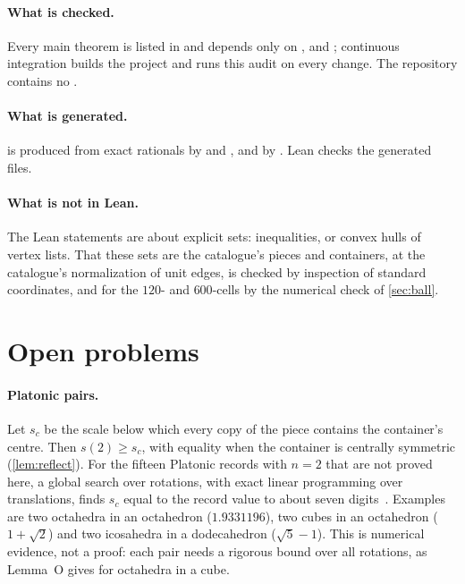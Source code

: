 \documentclass[11pt,a4paper]{article}
\begin{document}
\paragraph{What is checked.} Every main theorem is listed in  and depends only on ,  and ; continuous integration builds the project and runs this audit on every change. The repository contains no .

\paragraph{What is generated.}  is produced from exact rationals by  and , and  by . Lean checks the generated files.

\paragraph{What is not in Lean.} The Lean statements are about explicit sets: inequalities, or convex hulls of vertex lists. That these sets are the catalogue's pieces and containers, at the catalogue's normalization of unit edges, is checked by inspection of standard coordinates, and for the $120$- and $600$-cells by the numerical check of \cref{sec:ball}.

\section{Open problems}\label{sec:open}

\paragraph{Platonic pairs.} Let $s_c$ be the scale below which every copy of the piece contains the container's centre. Then $s(2)\ge s_c$, with equality when the container is centrally symmetric (\cref{lem:reflect}). For the fifteen Platonic records with $n=2$ that are not proved here, a global search over rotations, with exact linear programming over translations, finds $s_c$ equal to the record value to about seven digits~\cite{archive}. Examples are two octahedra in an octahedron ($1.9331196$), two cubes in an octahedron ($1+\sqrt2$) and two icosahedra in a dodecahedron ($\sqrt5-1$). This is numerical evidence, not a proof: each pair needs a rigorous bound over all rotations, as Lemma~O gives for octahedra in a cube.
\end{document}
